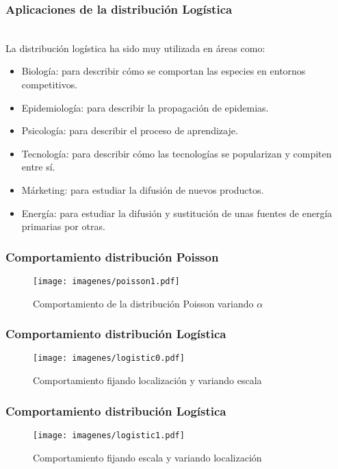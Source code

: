 \documentclass[12pt]{beamer}
\begin{document}
\begin{frame}
\frametitle{Aplicaciones de la distribución Logística}
~\\ La distribución logística ha sido muy utilizada en áreas como:
\begin{itemize}
\item Biología: para describir cómo se comportan las especies en entornos competitivos.
\item Epidemiología: para describir la propagación de epidemias.
\item Psicología: para describir el proceso de aprendizaje.
\item Tecnología: para describir cómo las tecnologías se popularizan y compiten entre sí.
\item Márketing: para estudiar la difusión de nuevos productos.
\item Energía: para estudiar la difusión y sustitución de unas fuentes de energía primarias por otras.
\end{itemize}
\end{frame}

\begin{frame}
\frametitle{Comportamiento distribución Poisson}
\begin{figure}[!h]
    \begin{center}
        \texttt{[image: imagenes/poisson1.pdf]}
        \caption{Comportamiento de la distribución Poisson variando $\alpha$}
        \label{fig:Densidad}
    \end{center}
\end{figure}
\end{frame}

\begin{frame}
\frametitle{Comportamiento distribución Logística}
\begin{figure}[!h]
    \begin{center}
        \texttt{[image: imagenes/logistic0.pdf]}
        \caption{Comportamiento fijando localización y variando escala}
        \label{fig:Densidad}
    \end{center}
\end{figure}
\end{frame}

\begin{frame}
\frametitle{Comportamiento distribución Logística}
\begin{figure}[!h]
    \begin{center}
        \texttt{[image: imagenes/logistic1.pdf]}
        \caption{Comportamiento fijando escala y variando localización}
        \label{fig:Densidad}
    \end{center}
\end{figure}
\end{frame}
\end{document}
